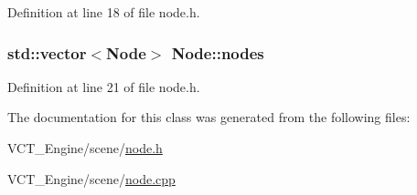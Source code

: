 Definition at line 18 of file node.\+h.

\hypertarget{class_node_a34418a952053ee6d9884174e86054e8b}{}
\subsubsection[{nodes}]{\setlength{\rightskip}{0pt plus 5cm}std\+::vector$<${\bf Node}$>$ Node\+::nodes}\label{class_node_a34418a952053ee6d9884174e86054e8b}


Definition at line 21 of file node.\+h.



The documentation for this class was generated from the following files\+:\begin{DoxyCompactItemize}
\item 
V\+C\+T\+\_\+\+Engine/scene/\hyperlink{node_8h}{node.\+h}\item 
V\+C\+T\+\_\+\+Engine/scene/\hyperlink{node_8cpp}{node.\+cpp}\end{DoxyCompactItemize}
